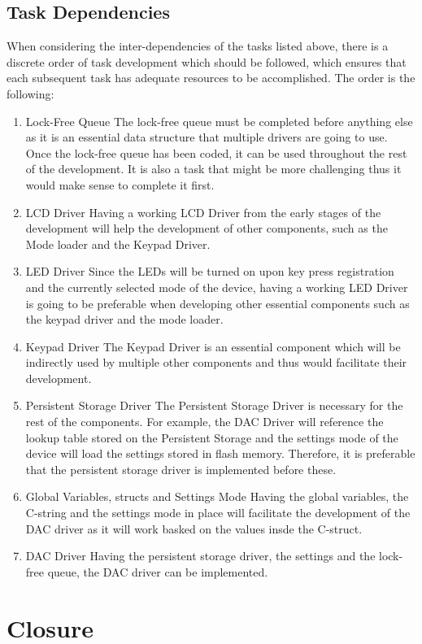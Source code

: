 \documentclass[11pt,a4paper,twocolumn]{scrartcl}
\begin{document}
\subsection{Task Dependencies}
When considering the inter-dependencies of the tasks listed above, there is a discrete order of task development which should be followed, which ensures that each subsequent task
has adequate resources to be accomplished. The order is the following:
\begin{enumerate}
    \item Lock-Free Queue
    The lock-free queue must be completed before anything else as it is an essential data structure that multiple drivers are going to use. Once the lock-free queue has been
    coded, it can be used throughout the rest of the development.
    It is also a task that might be more challenging thus it would make sense to complete it first.
    \item LCD Driver
    Having a working LCD Driver from the early stages of the development will help the development of other components, such as the Mode loader and the Keypad Driver.
    \item LED Driver
    Since the LEDs will be turned on upon key press registration and the currently selected mode of the device, having a working LED Driver is going to be preferable when developing
    other essential components such as the keypad driver and the mode loader.
    \item Keypad Driver
    The Keypad Driver is an essential component which will be indirectly used by multiple other components and thus would facilitate their development.
    \item Persistent Storage Driver
    The Persistent Storage Driver is necessary for the rest of the components. For example, the DAC Driver will reference the lookup table stored on the Persistent Storage and
    the settings mode of the device will load the settings stored in flash memory. Therefore, it is preferable that the persistent storage driver is implemented before these.
    \item Global Variables, structs and Settings Mode
    Having the global variables, the C-string and the settings mode in place will facilitate the development of the DAC driver as it will work basked on the values insde the C-struct.
    \item DAC Driver
    Having the persistent storage driver, the settings and the lock-free queue, the DAC driver can be implemented.
\end{enumerate}

\section{Closure}



\end{document}
